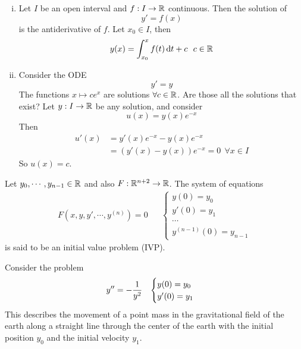 \documentclass[../../script.tex]{subfiles}
\begin{document}
\begin{eg}
    \begin{enumerate}[(i)]
        \item Let $I$ be an open interval and $f: I \rightarrow \mathbb{R}$ continuous. Then the solution of 
        \[
            y' = f(x)
        \]
        is the antiderivative of $f$. Let $x_0 \in I$, then 
        \[
            y(x) = \int_{x_0}^x f(t) \dd{t} + c ~~c \in \mathbb{R}
        \]
    
        \item Consider the ODE 
        \[
            y' = y
        \]
        The functions $x \mapsto c e^x$ are solutions $\forall c \in \mathbb{R}$. Are those all the solutions that exist?
        Let $y: I \rightarrow \mathbb{R}$ be any solution, and consider
        \[
            u(x) = y(x)e^{-x}
        \]
        Then 
        \begin{align*}
            u'(x) &= y'(x) e^{-x} - y(x)e^{-x} \\
            &= \left(y'(x) - y(x)\right) e^{-x} = 0 ~~\forall x \in I
        \end{align*}
        So $u(x) = c$.
    \end{enumerate}
\end{eg}

\begin{defi}
    Let $y_0, \cdots, y_{n-1} \in \mathbb{R}$ and also $F: \mathbb{R}^{n+2} \rightarrow \mathbb{R}$. The system of equations 
    \begin{align*}
        F(x, y, y', \cdots, y^{(n)}) = 0 && \begin{cases}
            y(0) = y_0 \\ 
            y'(0) = y_1\\
            \cdots \\ 
            y^{(n-1)}(0) = y_{n-1}
        \end{cases}
    \end{align*}
    is said to be an initial value problem (IVP).
\end{defi}

\begin{eg}
    Consider the problem 
    \begin{align*}
        y'' = -\frac{1}{y^2} && \begin{cases}
            y(0) = y_0 \\
            y'(0) = y_1
        \end{cases}
    \end{align*}
    This describes the movement of a point mass in the gravitational field of the earth along a straight line 
    through the center of the earth with the initial position $y_0$ and the initial velocity $y_1$.
\end{eg}
\end{document}
